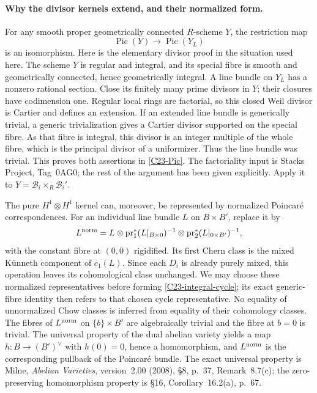 \documentclass[11pt]{article}
\theoremstyle{definition}\newtheorem{definition}[theorem]{Definition}\newtheorem{remark}[theorem]{Remark}
\begin{document}
\paragraph{Why the divisor kernels extend, and their normalized form.}
For any smooth proper geometrically connected $R$-scheme
$Y$, the restriction map
\begin{equation}\label{C23-Pic}
                         \operatorname{Pic}(Y)
                           \longrightarrow\operatorname{Pic}(Y_L)
\end{equation}
is an isomorphism.  Here is the elementary divisor proof in
the situation used here.  The scheme $Y$ is regular and
integral, and its special fibre is smooth and geometrically
connected, hence geometrically integral.  A line bundle on
$Y_L$ has a nonzero rational section.  Close its finitely many
prime divisors in $Y$; their closures have codimension one.
Regular local rings are factorial, so this closed Weil divisor
is Cartier and defines an extension.  If an extended line
bundle is generically trivial, a generic trivialization gives
a Cartier divisor supported on the special fibre.  As that
fibre is integral, this divisor is an integer multiple of the
whole fibre, which is the principal divisor of a uniformizer.
Thus the line bundle was trivial.  This proves both assertions
in \eqref{C23-Pic}.  The factoriality input is Stacks Project,
Tag~0AG0; the rest of the argument has been given explicitly.
Apply it to $Y=\mathcal B_i\times_R\mathcal B_i'$.

The pure $H^1\otimes H^1$ kernel can, moreover, be represented
by normalized Poincar\'e correspondences.
For an individual line bundle $L$ on $B\times B'$, replace it by
\[
 L^{\rm norm}=L\otimes
       \operatorname{pr}_1^*(L|_{B\times0})^{-1}
       \otimes\operatorname{pr}_2^*(L|_{0\times B'})^{-1},
\]
with the constant fibre at $(0,0)$ rigidified.
Its first Chern class is the mixed K\"unneth component of
$c_1(L)$.  Since each $D_i$ is already purely mixed, this
operation leaves its cohomological class unchanged.
We may choose these normalized representatives before forming
\eqref{C23-integral-cycle}; its exact generic-fibre identity
then refers to that chosen cycle representative.  No equality
of unnormalized Chow classes is inferred from equality of
their cohomology classes.
The fibres of $L^{\rm norm}$ on $\{b\}\times B'$ are
algebraically trivial and the fibre at $b=0$ is trivial.
The universal property of the dual abelian variety yields
a map $h:B\to(B')^\vee$ with $h(0)=0$, hence a homomorphism,
and $L^{\rm norm}$ is the corresponding pullback of the
Poincar\'e bundle.  The exact universal property is Milne,
\emph{Abelian Varieties}, version~2.00 (2008), \S8,
p.~37, Remark~8.7(c); the zero-preserving homomorphism
property is \S16, Corollary~16.2(a), p.~67.
\end{document}
